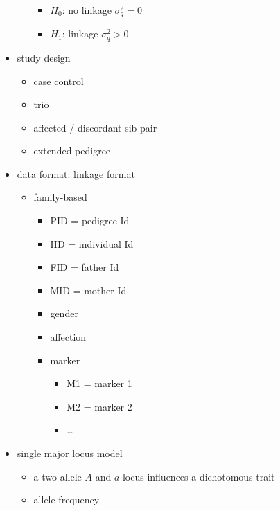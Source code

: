 \documentclass[
]{book}
\providecommand{\tightlist}{%
  \setlength{\itemsep}{0pt}\setlength{\parskip}{0pt}}
\theoremstyle{definition}
\theoremstyle{definition}
\theoremstyle{definition}
\theoremstyle{definition}
\theoremstyle{remark}
\begin{document}
\begin{itemize}
\begin{itemize}
    \begin{itemize}
    \tightlist
    \item
      \(H_0\): no linkage \(\sigma^2_{q} = 0\)
    \item
      \(H_1\): linkage \(\sigma^2_{q} > 0\)
    \end{itemize}
  \end{itemize}
\item
  study design

  \begin{itemize}
  \tightlist
  \item
    case control
  \item
    trio
  \item
    affected / discordant sib-pair
  \item
    extended pedigree
  \end{itemize}
\item
  data format: linkage format

  \begin{itemize}
  \tightlist
  \item
    family-based

    \begin{itemize}
    \tightlist
    \item
      PID = pedigree Id
    \item
      IID = individual Id
    \item
      FID = father Id
    \item
      MID = mother Id
    \item
      gender
    \item
      affection
    \item
      marker

      \begin{itemize}
      \tightlist
      \item
        M1 = marker 1
      \item
        M2 = marker 2
      \item
        \ldots{}
      \end{itemize}
    \end{itemize}
  \end{itemize}
\item
  single major locus model

  \begin{itemize}
  \tightlist
  \item
    a two-allele \(A\) and \(a\) locus influences a dichotomous trait
  \item
    allele frequency


\end{itemize}
\end{itemize}
\end{document}
